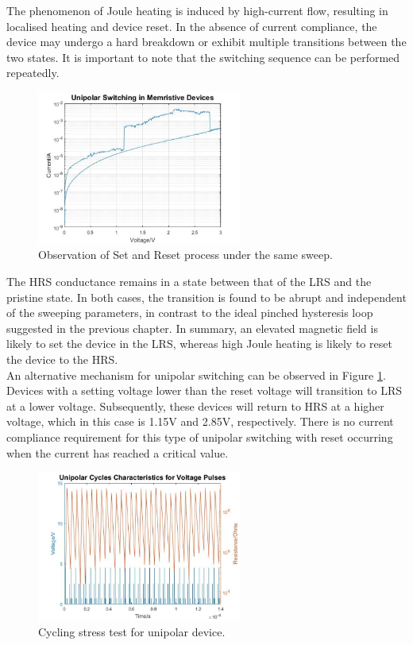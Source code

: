 \noindent The phenomenon of Joule heating is induced by high-current flow, resulting in localised heating and device reset. In the absence of current compliance, the device may undergo a hard breakdown or exhibit multiple transitions between the two states. It is important to note that the switching sequence can be performed repeatedly.\\ 

\begin{figure}[htbp!] 
    \centering    
    \includegraphics[width=0.6\textwidth]{Chapter3/Figs/i.png}
    \caption[Observation of Set and Reset process under the same sweep.]{Observation of Set and Reset process under the same sweep.}
    \label{fig:3i}
\end{figure}

\noindent The HRS conductance remains in a state between that of the LRS and the pristine state. In both cases, the transition is found to be abrupt and independent of the sweeping parameters, in contrast to the ideal pinched hysteresis loop suggested in the previous chapter. In summary, an elevated magnetic field is likely to set the device in the LRS, whereas high Joule heating is likely to reset the device to the HRS.\\


\noindent An alternative mechanism for unipolar switching can be observed in Figure \ref{fig:3i}. Devices with a setting voltage lower than the reset voltage will transition to LRS at a lower voltage. Subsequently, these devices will return to HRS at a higher voltage, which in this case is 1.15V and 2.85V, respectively. There is no current compliance requirement for this type of unipolar switching with reset occurring when the current has reached a critical value. \\

\begin{figure}[htbp!] 
    \centering    
    \includegraphics[width=0.6\textwidth]{Chapter3/Figs/j.png}
    \caption[Cycling stress test for unipolar device.]{Cycling stress test for unipolar device.}
    \label{fig:3j}
\end{figure}

